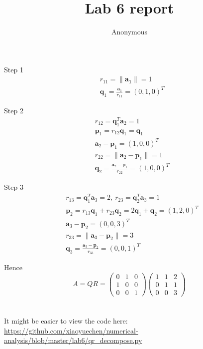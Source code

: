 \documentclass{article}
\title{Lab 6 report}
\author{Anonymous}
\begin{document}
\maketitle

\section{}
Step 1
\begin{align*}
	 & r_{11} = \|\boldsymbol{a_1}\| = 1                              \\
	 & \boldsymbol{q}_1 = \frac{\boldsymbol{a}_1}{r_{11}} = (0,1,0)^T
\end{align*}

Step 2
\begin{align*}
	 & r_{12} = \boldsymbol{q}_1^T \boldsymbol{a}_2 = 1              \\
	 & \boldsymbol{p}_1 = r_{12} \boldsymbol{q}_1 = \boldsymbol{q}_1 \\
	 & \boldsymbol{a}_2 - \boldsymbol{p}_1 = (1,0,0)^T               \\
	 & r_{22} = \|\boldsymbol{a}_2 - \boldsymbol{p}_1\| = 1          \\
	 & \boldsymbol{q}_2 =
	\frac
	{\boldsymbol{a}_2 - \boldsymbol{p}_1}
	{r_{22}}
	= (1,0,0)^T
\end{align*}

Step 3
\begin{align*}
	 & r_{13} = \boldsymbol{q}_1^T \boldsymbol{a}_3
	= 2,~ r_{23} = \boldsymbol{q}_2^T \boldsymbol{a}_3 = 1                   \\
	 & \boldsymbol{p}_2 = r_{13}\boldsymbol{q}_1 + r_{23}\boldsymbol{q}_2
	= 2\boldsymbol{q}_1 + \boldsymbol{q}_2 = (1,2,0)^T                       \\
	 & \boldsymbol{a}_3 - \boldsymbol{p}_2 = (0,0,3)^T                       \\
	 & r_{33} = \|\boldsymbol{a}_3 - \boldsymbol{p}_2\| = 3                  \\
	 & \boldsymbol{q}_3 = \frac{\boldsymbol{a}_3 - \boldsymbol{p}_2}{r_{33}}
	= (0,0,1)^T
\end{align*}

Hence
\begin{equation*}
	A = QR =
	\begin{pmatrix}
		0 & 1 & 0 \\
		1 & 0 & 0 \\
		0 & 0 & 1
	\end{pmatrix}
	\begin{pmatrix}
		1 & 1 & 2 \\
		0 & 1 & 1 \\
		0 & 0 & 3
	\end{pmatrix}
\end{equation*}

\section{}
It might be easier to view the code here:
\url{https://github.com/xiaoyuechen/numerical-analysis/blob/master/lab6/qr_decompose.py}

\end{document}
